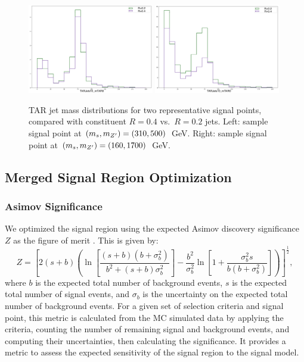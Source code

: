 \begin{figure}[h]
  \centering
     \includegraphics[width = 0.49\textwidth]{Figures/4/TAR/04_monoSww_semilep_zp500_dm200_dh310.png}
     \includegraphics[width = 0.49\textwidth]{Figures/4/TAR/04_monoSww_semilep_zp1700_dm200_dh160.png}

     \caption{TAR jet mass distributions for two representative signal points, compared with constituent \akt $R=0.4$ vs.~\akt $R=0.2$ jets. Left: sample signal point at $(m_s, m_{Z^\prime})=(310, 500)$~GeV. Right: sample signal point at $(m_s, m_{Z^\prime})=(160, 1700)$~GeV.}
     \label{fig:R04_TAR_plots}
\end{figure}
\FloatBarrier
\subsection{Merged Signal Region Optimization}
\label{subsection:sr_opt}
\subsubsection{Asimov Significance}
We optimized the \merged signal region using the expected Asimov discovery significance $Z$ as the figure of merit  \cite{Asimov}. This is given by:
\begin{equation}
  Z = \left[ 2(s+b)\left(
    \ln\left[ \frac{(s+b)(b+\sigma_b^2)}{b^2 + (s+b)\sigma_b^2} \right]
    - \frac{b^2}{\sigma_b^2}\ln\left[ 1 + \frac{\sigma_b^2 s}{b(b+\sigma_b^2)} \right]
  \right) \right]^\frac{1}{2},
  \label{eq:asimov}
\end{equation}
where $b$ is the expected total number of background events, $s$ is the expected total number of signal events, and $\sigma_b$ is the uncertainty on the expected total number of background events. For a given set of selection criteria and signal point, this metric is calculated from the MC simulated data by applying the criteria, counting the number of remaining signal and background events, and computing their uncertainties, then calculating the significance. It provides a metric to assess the expected sensitivity of the signal region to the signal model.

